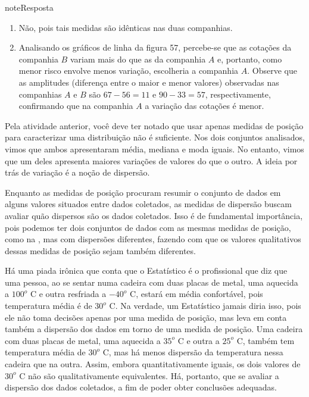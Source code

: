 \begin{sphinxadmonition}{note}{Resposta}
\begin{enumerate}
\item {} 
Não, pois tais medidas são idênticas nas duas companhias.

\item {} 
Analisando os gráficos de linha da figura 57, percebe-se que as cotações da companhia \(B\) variam mais do que as da companhia \(A\) e, portanto, como menor risco envolve menos variação, escolheria a companhia \(A\). Observe que as amplitudes (diferença entre o maior e menor valores) observadas nas companhias \(A\) e \(B\) são \(67-56=11\) e \(90-33=57\), respectivamente, confirmando que na companhia \(A\) a variação das cotações é menor.

\end{enumerate}
\end{sphinxadmonition}


\label{\detokenize{PE104-4:sec-organizando2}}\label{\detokenize{PE104-4::doc}}\label{\detokenize{PE104-4:organizando-as-ideias-medidas-de-dispersao}}
Pela atividade anterior, você deve ter notado que usar apenas medidas de posição para caracterizar uma distribuição não é suficiente. Nos dois conjuntos analisados, vimos que ambos apresentaram média, mediana e moda iguais. No entanto, vimos que um deles apresenta maiores variações de valores do que o outro. A ideia por trás de variação é a noção de dispersão.

Enquanto as medidas de posição procuram resumir o conjunto de dados em alguns valores situados entre dados coletados, as medidas de dispersão buscam avaliar quão dispersos são os dados coletados. Isso é de fundamental importância, pois podemos ter dois conjuntos de dados com as mesmas medidas de posição, como na , mas com dispersões diferentes, fazendo com que os valores qualitativos dessas medidas de posição sejam também diferentes.

Há uma piada irônica que conta que o Estatístico é o profissional que diz que uma pessoa, ao se sentar numa cadeira com duas placas de metal, uma aquecida a \(100^o\) C e outra resfriada a \(-40^o\) C, estará em média confortável, pois temperatura média é de \(30^o\) C. Na verdade, um Estatístico jamais diria isso, pois ele não toma decisões apenas por uma medida de posição, mas leva em conta também a dispersão dos dados em torno de uma medida de posição. Uma cadeira com duas placas de metal, uma aquecida a \(35^o\) C e outra a \(25^o\) C, também tem temperatura média de \(30^o\) C, mas há menos dispersão da temperatura nessa cadeira que na outra. Assim, embora quantitativamente iguais, os dois valores de \(30^o\) C não são qualitativamente equivalentes. Há, portanto, que se avaliar a dispersão dos dados coletados, a fim de poder obter conclusões adequadas.

